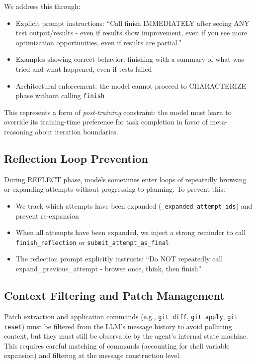 \documentclass{article}
\theoremstyle{plain}
\theoremstyle{definition}
\theoremstyle{remark}
\begin{document}
We address this through:
\begin{itemize}
    \item Explicit prompt instructions: ``Call finish IMMEDIATELY after seeing ANY test output/results - even if results show improvement, even if you see more optimization opportunities, even if results are partial.''
    \item Examples showing correct behavior: finishing with a summary of what was tried and what happened, even if tests failed
    \item Architectural enforcement: the model cannot proceed to CHARACTERIZE phase without calling \texttt{finish}
\end{itemize}

This represents a form of \emph{post-training} constraint: the model must learn to override its training-time preference for task completion in favor of meta-reasoning about iteration boundaries.

\subsection{Reflection Loop Prevention}
During REFLECT phase, models sometimes enter loops of repeatedly browsing or expanding attempts without progressing to planning. To prevent this:
\begin{itemize}
    \item We track which attempts have been expanded (\texttt{\_expanded\_attempt\_ids}) and prevent re-expansion
    \item When all attempts have been expanded, we inject a strong reminder to call \texttt{finish\_reflection} or \texttt{submit\_attempt\_as\_final}
    \item The reflection prompt explicitly instructs: ``Do NOT repeatedly call expand\_previous\_attempt - browse once, think, then finish''
\end{itemize}

\subsection{Context Filtering and Patch Management}
Patch extraction and application commands (e.g., \texttt{git diff}, \texttt{git apply}, \texttt{git reset}) must be filtered from the LLM's message history to avoid polluting context, but they must still be observable by the agent's internal state machine. This requires careful matching of commands (accounting for shell variable expansion) and filtering at the message construction level.
\end{document}
